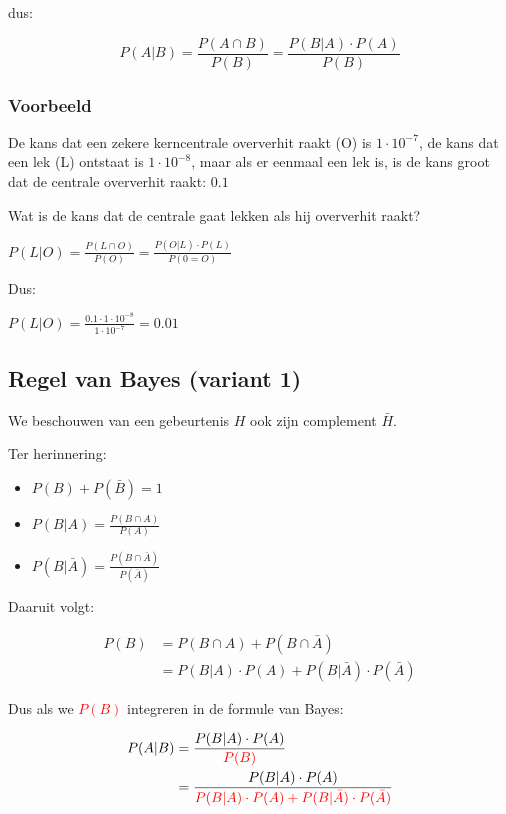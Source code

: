 \documentclass{article}
\begin{document}
dus:

\begin{equation}
    P(A | B) = \frac{P(A \cap B)}{P(B)} = \frac{P(B | A) \cdot P(A)}{P(B)}
\end{equation}

\subsubsection{Voorbeeld}

De kans dat een zekere kerncentrale oververhit raakt (O) is $1\cdot 10^{-7}$,
de kans dat een lek (L) ontstaat is $1\cdot 10^{-8}$, maar als er eenmaal
een lek is, is de kans groot dat de centrale oververhit raakt: $0.1$

Wat is de kans dat de centrale gaat lekken als hij oververhit raakt?

$P(L|O) = \frac{P(L\cap O)}{P(O)} = \frac{P(O|L)\cdot P(L)}{P(0=O)}$

Dus:

$P(L|O) = \frac{0.1 \cdot 1 \cdot 10^{-8}}{1\cdot 10^{-7}} = 0.01$


\subsection{Regel van Bayes (variant 1)}

We beschouwen van een gebeurtenis $H$ ook zijn complement $\bar{H}$.

Ter herinnering:

\begin{itemize}
    \item $P(B) + P(\bar{B}) = 1$
    \item $P(B|A) = \frac{P(B \cap A)}{P(A)}$
    \item $P(B|\bar{A}) = \frac{P(B \cap \bar{A})}{P(\bar{A})}$
\end{itemize}

Daaruit volgt:

\begin{equation*}
    \begin{aligned}
        P(B) & = P(B \cap A) + P(B \cap \bar{A})\\
        & = P(B | A) \cdot P(A) + P(B | \bar{A}) \cdot P(\bar{A})
    \end{aligned}
\end{equation*}

Dus als we \textcolor{red}{$P(B)$} integreren in de formule van Bayes:

\begin{equation}
    \begin{aligned}
        P(A|B) &= \frac{P(B|A) \cdot P(A)}{\textcolor{red}{P(B)}}\\
        &= \frac{P(B|A) \cdot P(A)}{\textcolor{red}{P(B|A)\cdot P(A) + P(B|\bar{A})\cdot P(\bar{A})}}
    \end{aligned}
\end{equation}
\end{document}

